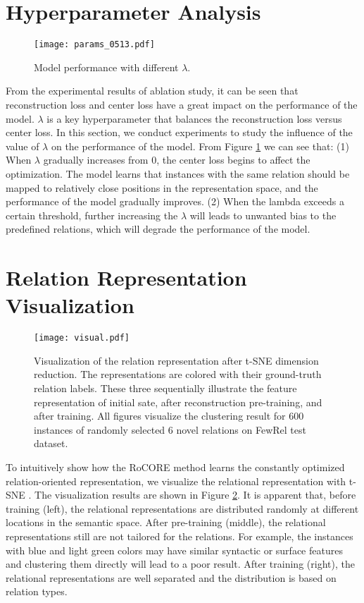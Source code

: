 \documentclass[11pt]{article}
\begin{document}


\appendix
\section{Hyperparameter Analysis}
        \label{app:Hyper}
        \begin{figure}[t]
            \texttt{[image: params\_0513.pdf]}
            \caption{Model performance with different $\lambda$.}
            \label{fig:lambda}
        \end{figure}
        From the experimental results of ablation study, it can be seen that reconstruction loss and center loss have a great impact on the performance of the model. $\lambda$ is a key hyperparameter that balances the reconstruction loss versus center loss. In this section, we conduct experiments to study the influence of the value of $\lambda$ on the performance of the model. From Figure \ref{fig:lambda} we can see that: (1) When $\lambda$ gradually increases from 0, the center loss begins to affect the optimization. The model learns that instances with the same relation should be mapped to relatively close positions in the representation space, and the performance of the model gradually improves. (2) When the lambda exceeds a certain threshold, further increasing the $\lambda$ will leads to unwanted bias to the predefined relations, which will degrade the performance of the model.
        
    \section{Relation Representation Visualization}
    \label{app:visual}
    \begin{figure}[]
        \centering \texttt{[image: visual.pdf]}
        \caption{Visualization of the relation representation after t-SNE dimension reduction. The representations are colored with their ground-truth relation labels.
        These three sequentially illustrate the feature representation of initial sate, after reconstruction pre-training, and after training. All figures visualize the clustering result for 600 instances of randomly selected 6 novel relations on FewRel test dataset.}
        \label{fig:visual}
    \end{figure}   
    To intuitively show how the RoCORE method learns the constantly optimized relation-oriented representation, we visualize the relational representation with t-SNE \citep{JMLR:v9:vandermaaten08a}. The visualization results are shown in Figure \ref{fig:visual}. It is apparent that, before training (left), the relational representations are distributed randomly  at different locations in the semantic space. After pre-training (middle), the relational representations still are not tailored for the relations. For example, the instances with blue and light green colors may have similar syntactic or surface features and clustering them directly will lead to a poor result. After training (right), the relational representations are well separated and the 
   distribution is based on relation types. 
\end{document}
